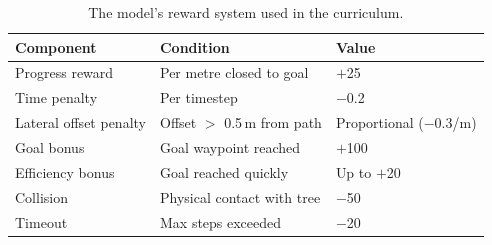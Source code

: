 \begin{table}[H]
    \small
    \centering
    \caption{The model's reward system used in the curriculum.}
    \label{tab:reward}
    \begin{tabular}{p{4.5cm} p{5cm} p{3cm}}
        \hline\hline
        \rowcolor{lightgray}\textbf{Component} & \textbf{Condition} & \textbf{Value} \\\hline
        Progress reward & Per metre closed to goal & $+$25 \\
        \rowcolor{lightlightgray} Time penalty & Per timestep & $-$0.2 \\
        Lateral offset penalty & Offset $>$ 0.5\,m from path & Proportional ($-$0.3/m) \\
        \rowcolor{lightlightgray} Goal bonus & Goal waypoint reached & $+$100 \\
        Efficiency bonus & Goal reached quickly & Up to $+$20 \\
        \rowcolor{lightlightgray} Collision & Physical contact with tree & $-$50 \\
        Timeout & Max steps exceeded & $-$20 \\
        \hline
    \end{tabular}
\end{table}
